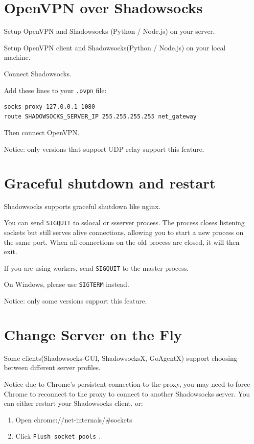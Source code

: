 \documentclass[11pt,a4paper]{sphinxmanual}
\begin{document}
\section{OpenVPN over Shadowsocks}
\label{sec-6-7}
Setup OpenVPN and Shadowsocks (Python / Node.js) on your server.

Setup OpenVPN client and Shadowsocks(Python / Node.js) on your local machine.

Connect Shadowsocks.

Add these lines to your \verb~.ovpn~ file:

\begin{Verbatim}
socks-proxy 127.0.0.1 1080
route SHADOWSOCKS_SERVER_IP 255.255.255.255 net_gateway
\end{Verbatim}

Then connect OpenVPN.

Notice: only versions that support UDP relay support this feature.


\label{sec:graceful_shutdown_and_restart}
\section{Graceful shutdown and restart}
\label{sec-6-8}
Shadowsocks supports graceful shutdown like nginx.

You can send \verb~SIGQUIT~ to sslocal or ssserver process. The process closes listening sockets but still serves alive connections, allowing you to start a new process on the same port. When all connections on the old process are closed, it will then exit.

If you are using workers, send \verb~SIGQUIT~ to the master process.

On Windows, please use \verb~SIGTERM~ instead.

Notice: only some versions support this feature.


\section{Change Server on the Fly}
\label{sec-6-9}
Some clients(Shadowsocks-GUI, ShadowsocksX, GoAgentX) support choosing between different server profiles.

Notice due to Chrome's persistent connection to the proxy, you may need to force Chrome to reconnect to the proxy to connect to another Shadowsocks server. You can either restart your Shadowsocks client, or:

\begin{enumerate}
\item Open chrome://net-internals/\#sockets
\item Click \verb~Flush socket pools~ .
\end{enumerate}
\end{document}
